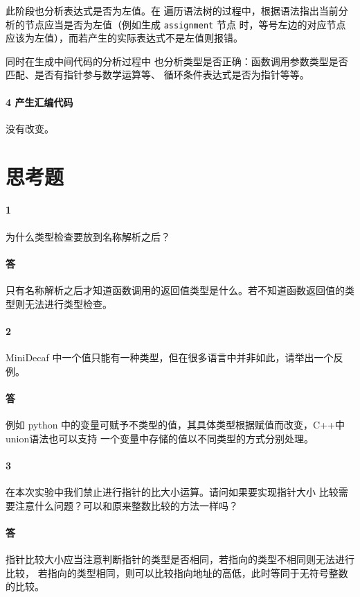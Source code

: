 \documentclass[UTF8]{ctexart}
\newcommand{\T}[1]{\texttt{{#1}}}
\begin{document}
            此阶段也分析表达式是否为左值。在
            遍历语法树的过程中，根据语法指出当前分析的节点应当是否为左值（例如生成 \T{assignment} 节点
            时，等号左边的对应节点应该为左值），而若产生的实际表达式不是左值则报错。

            同时在生成中间代码的分析过程中
            也分析类型是否正确：函数调用参数类型是否匹配、是否有指针参与数学运算等、
            循环条件表达式是否为指针等等。

            \paragraph{4 产生汇编代码} 没有改变。
        
    \section{思考题}
        \paragraph{1} 为什么类型检查要放到名称解析之后？
        \paragraph{答} 只有名称解析之后才知道函数调用的返回值类型是什么。若不知道函数返回值的类型则无法进行类型检查。
        \paragraph{2} MiniDecaf 中一个值只能有一种类型，但在很多语言中并非如此，请举出一个反例。
        \paragraph{答} 例如 python 中的变量可赋予不类型的值，其具体类型根据赋值而改变，C++中union语法也可以支持
        一个变量中存储的值以不同类型的方式分别处理。
        \paragraph{3} 在本次实验中我们禁止进行指针的比大小运算。请问如果要实现指针大小
        比较需要注意什么问题？可以和原来整数比较的方法一样吗？
        \paragraph{答} 指针比较大小应当注意判断指针的类型是否相同，若指向的类型不相同则无法进行比较，
        若指向的类型相同，则可以比较指向地址的高低，此时等同于无符号整数的比较。
\end{document}
